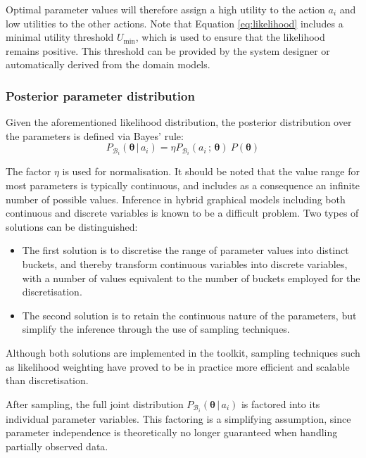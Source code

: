 Optimal parameter values will therefore assign a high utility to the action $a_i$ and low utilities to the other actions. Note that Equation \eqref{eq:likelihood} includes a minimal utility threshold $U_{\mathrm{min}}$, which is used to ensure that the likelihood remains positive. This threshold can be provided by the system designer or automatically derived from the domain models. 

\subsubsection*{Posterior parameter distribution}

Given the aforementioned likelihood distribution, the posterior distribution over the parameters is defined via Bayes' rule: 
\begin{equation}
P_{\mathcal{B}_i}(\boldsymbol\theta \, | \, a_i) = \eta P_{\mathcal{B}_i}(a_i \, ; \, \boldsymbol\theta) \ P(\boldsymbol\theta )
\end{equation}

The factor $\eta$ is used for normalisation. It should be noted that the value range for most parameters is typically continuous, and includes as a consequence an infinite number of possible values. Inference in hybrid graphical models including both continuous and discrete variables is known to be a difficult problem.  Two types of solutions can be distinguished:
\begin{itemize}
\item The first solution is to discretise the range of parameter values into distinct buckets, and thereby transform continuous variables into discrete variables, with a number of values equivalent to the number of buckets employed for the discretisation.
\item The second solution is to retain the continuous nature of the parameters, but simplify the inference through the use of sampling techniques.  
\end{itemize}

Although both solutions are implemented in the \opendial toolkit, sampling techniques such as likelihood weighting have proved to be in practice more efficient and scalable than discretisation. 

After sampling, the full joint distribution $P_{\mathcal{B}_i}(\boldsymbol\theta \, | \, a_i)$ is factored into its individual parameter variables. This factoring is a simplifying assumption, since parameter independence is theoretically no longer guaranteed when handling partially observed data. 

